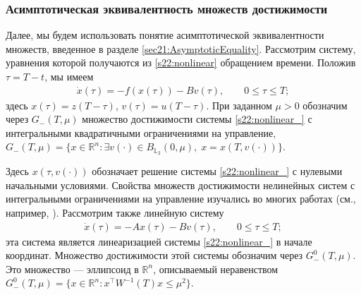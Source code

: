 \documentclass[../main.tex]{subfiles}
\begin{document}
\subsubsection{Асимптотическая эквивалентность множеств достижимости}

Далее, мы будем использовать понятие асимптотической эквивалентности множеств, введенное в разделе \ref{sec21:AsymptoticEquality}. 
Рассмотрим систему, уравнения которой получаются из \eqref{s22:nonlinear} обращением времени. 
Положив $\tau=T-t$, мы имеем
\begin{gather}\label{s22:nonlinear_}
 \dot{x}(\tau)=-f(x(\tau))-B v(\tau),\qquad 0 \leqslant \tau \leqslant T; 
\end{gather}
здесь $x(\tau)=z(T-\tau)$, $v(\tau)=u(T-\tau)$.
При заданном $\mu>0$ обозначим через $ G_{-} (T,\mu)$ множество достижимости системы \eqref{s22:nonlinear_} с интегральными квадратичными ограничениями на управление, $G_{-}(T,\mu)=\{x\in \mathbb{R}^n:\exists v(\cdot)\in B_{\mathbb{L}_2}(0,\mu),\; x=x( T,v(\cdot))\}$.
 
Здесь $x( \tau,v(\cdot))$ обозначает решение системы \eqref{s22:nonlinear_} с нулевыми начальными условиями. 
Свойства множеств достижимости нелинейных систем с интегральными ограничениями на управление изучались во многих работах (см., например, \cite{Guseinov2010,Rousse,GusZykIFAC}).
Рассмотрим также линейную систему 
\begin{gather}\label{s22:linear_}
 \dot{x}(\tau)=-Ax(\tau)-B v(\tau),\qquad 0 \leqslant \tau \leqslant T; 
\end{gather}
эта система является линеаризацией системы \eqref{s22:nonlinear_} в начале координат. 
Множество достижимости этой системы обозначим через $G_{-}^0(T,\mu)$. 
Это множество --- эллипсоид в $\mathbb{R}^n$, описываемый неравенством $G_{-}^0(T,\mu)=\{x \in \mathbb{R}^n: x^\top W^{-1}(T)x\leqslant \mu^2\}$. 

\end{document}
